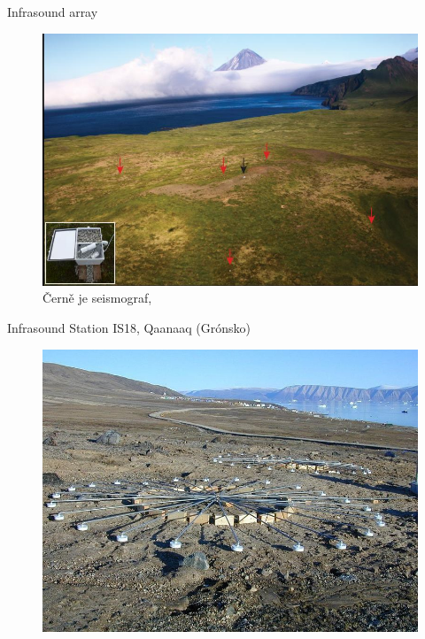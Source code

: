 \documentclass[10pt, notes]{beamer}
\begin{document}
\begin{frame}{Infrasound array}
    \begin{figure}[h]
        \centering
        \includegraphics[width=.9\textwidth]{array.jpg}
        \caption{Černě je seismograf, \cite{volcano2}}
    \end{figure}
\end{frame}

\begin{frame}{Infrasound Station IS18, Qaanaaq (Grónsko)}
    \begin{figure}[h]
        \centering
        \includegraphics[height=.8\textheight]{array2}
        \caption{\cite{array2}}
    \end{figure}
    
\end{frame}
\end{document}
